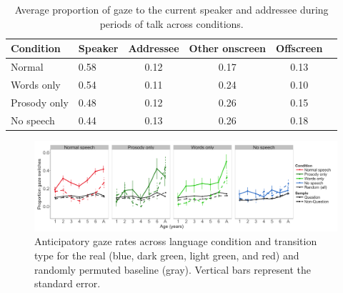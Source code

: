 \documentclass[authoryear, 12pt]{elsarticle}
\begin{document}
\begin{table}[h]
\begin{center}
  \begin{tabular}{llcccc}
    \hline
    Condition & Speaker & Addressee & Other onscreen & Offscreen\\ 
    \hline
    Normal & 0.58 & 0.12 & 0.17 & 0.13 \\ 
    Words only & 0.54 & 0.11 & 0.24 & 0.10 \\ 
    Prosody only & 0.48 & 0.12 & 0.26 & 0.15 \\ 
    No speech & 0.44 & 0.13 & 0.26 & 0.18 \\
    \hline
  \end{tabular}
\end{center}
  \caption{Average proportion of gaze to the current speaker and addressee during periods of talk across conditions.}
\label{tab:look_e2b}
\end{table}


\begin{figure}[h]
\begin{center}
\includegraphics[width=\textwidth]{figures/E2-samples-by-lang-groups-trans-types.png}
\end{center}
\caption{Anticipatory gaze rates across language condition and transition type for the real (blue, dark green, light green, and red) and randomly permuted baseline (gray). Vertical bars represent the standard error.} 
\label{fig:E2-randvsreal}
\end{figure}
\end{document}
